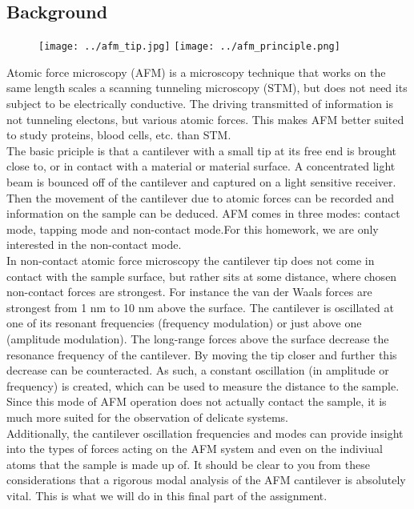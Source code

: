 \documentclass{article}
\begin{document}
\subsection{Background}
\begin{figure}[ht]
	\texttt{[image: ../afm\_tip.jpg]}
	\texttt{[image: ../afm\_principle.png]}
\end{figure}
Atomic force microscopy (AFM) is a microscopy technique that works on the same length scales a
scanning tunneling microscopy (STM), but does not need its subject to be electrically conductive.
The driving transmitted of information is not tunneling electons, but various atomic forces. This
makes AFM better suited to study proteins, blood cells, etc. than STM.\\


The basic priciple is that a cantilever with a small tip at its free end is brought close to, or in contact
with a material or material surface. A concentrated light beam is bounced off of the cantilever and
captured on a light sensitive receiver. Then the movement of the cantilever due to atomic forces can
be recorded and information on the sample can be deduced.
AFM comes in three modes: contact mode, tapping mode and non-contact mode.For this homework,
we are only interested in the non-contact mode.\\


In non-contact atomic force microscopy the cantilever tip does not come in contact with the sample
surface, but rather sits at some distance, where chosen non-contact forces are strongest. For instance
the van der Waals forces are strongest from 1 nm to 10 nm above the surface. The cantilever is oscillated
at one of its resonant frequencies (frequency modulation) or just above one (amplitude modulation).
The long-range forces above the surface decrease the resonance frequency of the cantilever. By moving
the tip closer and further this decrease can be counteracted. As such, a constant oscillation (in
amplitude or frequency) is created, which can be used to measure the distance to the sample. Since
this mode of AFM operation does not actually contact the sample, it is much more suited for the
observation of delicate systems.\\


Additionally, the cantilever oscillation frequencies and modes can provide insight into the types of
forces acting on the AFM system and even on the indiviual atoms that the sample is made up of.
It should be clear to you from these considerations that a rigorous modal analysis of the AFM cantilever
is absolutely vital. This is what we will do in this final part of the assignment.
\end{document}
